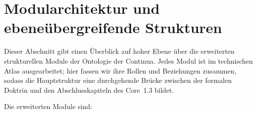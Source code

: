 
\section{Modularchitektur und ebeneübergreifende Strukturen}
\label{sec:modules_master}

Dieser Abschnitt gibt einen Überblick auf hoher Ebene über die erweiterten strukturellen
Module der Ontologie der Continua. Jedes Modul ist im technischen Atlas ausgearbeitet;
hier fassen wir ihre Rollen und Beziehungen zusammen, sodass die Hauptstruktur eine durchgehende
Brücke zwischen der formalen Doktrin und den Abschlusskapiteln des Core~1.3 bildet.

Die erweiterten Module sind:

